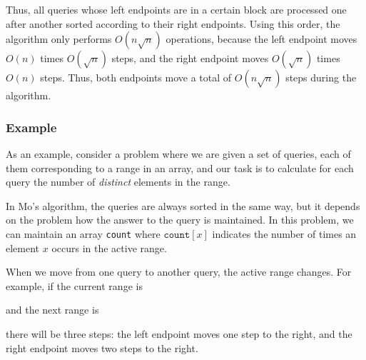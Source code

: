 Thus, all queries whose left endpoints are
in a certain block are processed one after another
sorted according to their right endpoints.
Using this order, the algorithm
only performs $O(n \sqrt n)$ operations,
because the left endpoint moves
$O(n)$ times $O(\sqrt n)$ steps,
and the right endpoint moves
$O(\sqrt n)$ times $O(n)$ steps. Thus, both
endpoints move a total of $O(n \sqrt n)$ steps during the algorithm.

\subsubsection*{Example}

As an example, consider a problem
where we are given a set of queries,
each of them corresponding to a range in an array,
and our task is to calculate for each query
the number of \emph{distinct} elements in the range.

In Mo's algorithm, the queries are always sorted
in the same way, but it depends on the problem
how the answer to the query is maintained.
In this problem, we can maintain an array
\texttt{count} where $\texttt{count}[x]$
indicates the number of times an element $x$
occurs in the active range.

When we move from one query to another query,
the active range changes.
For example, if the current range is
\begin{center}
\end{center}
and the next range is
\begin{center}
\end{center}
there will be three steps:
the left endpoint moves one step to the right,
and the right endpoint moves two steps to the right.

